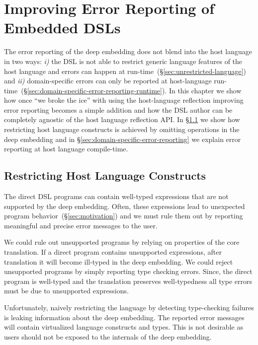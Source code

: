 \chapter{Improving Error Reporting of Embedded DSLs}
\label{sec:error-reporting}

The error reporting of the deep embedding does not blend into the host language in two ways:
 \emph{i)} the DSL is not able to restrict generic language features of the host language and errors can happen at run-time~(\S \ref{sec:unrestricted-language}) and \emph{ii)} domain-specific errors can only be reported at host-language run-time~(\S \ref{sec:domain-specific-error-reporting-runtime}). In this chapter we show how once ``we broke the ice'' with using the host-language reflection improving error reporting becomes a simple addition and how the DSL author can
 be completely agnostic of the host language reflection API. In \S \ref{sec:restricting} we
 show how restricting host language constructs is achieved by omitting operations in
 the deep embedding and in \S \ref{sec:domain-specific-error-reporting} we explain
 error reporting at host language compile-time.


\section{Restricting Host Language Constructs}
\label{sec:restricting}

The direct DSL programs can contain well-typed expressions that are not
supported by the deep embedding. Often, these expressions lead to unexpected program
behavior~(\S \ref{sec:motivation}) and we must rule them out by reporting meaningful and
precise error messages to the user.

We could rule out unsupported programs by relying on properties of the
core translation. If a direct program contains unsupported expressions, after
translation it will become ill-typed in the deep embedding. We could reject
unsupported programs by simply reporting type checking errors. Since, the
direct program is well-typed and the translation preserves well-typedness all
type errors must be due to unsupported expressions.

Unfortunately, naively restricting the language by detecting type-checking
failures is leaking information about the deep embedding. The reported error
messages will contain virtualized language constructs and types. This is not desirable
as users should not be exposed to the internals of the deep embedding.

